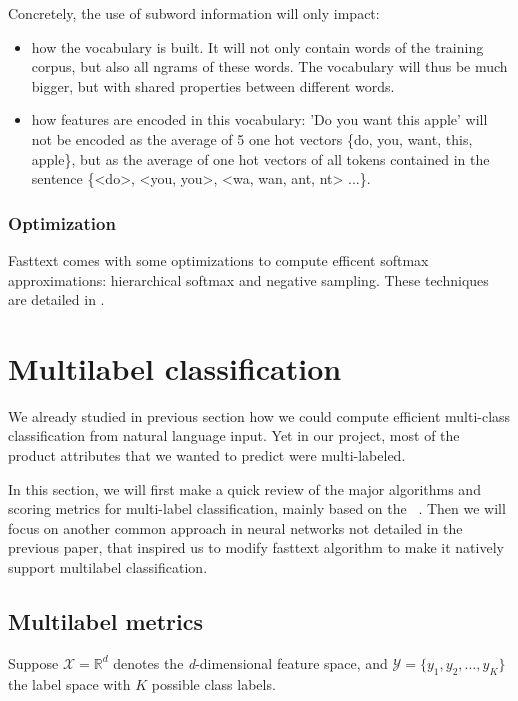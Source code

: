Concretely, the use of subword information will only impact:
\begin{itemize}
	\item how the vocabulary is built. It will not only contain words of the training corpus, but also all ngrams of these words. The vocabulary will thus be much bigger, but with shared properties between different words.
	\item how features are encoded in this vocabulary: 'Do you want this apple' will not be encoded as the average of 5 one hot vectors \{do, you, want, this, apple\}, but as the average of one hot vectors of all tokens contained in the sentence \{<do>, <you, you>, <wa, wan, ant, nt> ...\}.
\end{itemize}

\subsubsection{Optimization}

Fasttext comes with some optimizations to compute efficent softmax approximations: hierarchical softmax and negative sampling. These techniques are detailed in \cite{fasttextTricks}.

\pagebreak
\section{Multilabel classification}

We already studied in previous section how we could compute efficient multi-class classification from natural language input. Yet in our project, most of the product attributes that we wanted to predict were multi-labeled.

In this section, we will first make a quick review of the major algorithms and scoring metrics for multi-label classification, mainly based on the ~\cite[following paper]{MultilabelReview}. Then we will focus on another common approach in neural networks not detailed in the previous paper, that inspired us to modify fasttext algorithm to make it natively support multilabel classification.


\subsection{Multilabel metrics}

Suppose $\mathcal{X} = \mathbb{R}^d$ denotes the \textit{d}-dimensional feature space, and  $\mathcal{Y} = \{y_1, y_2, \dots, y_K \}$ the label space with $K$ possible class labels.

